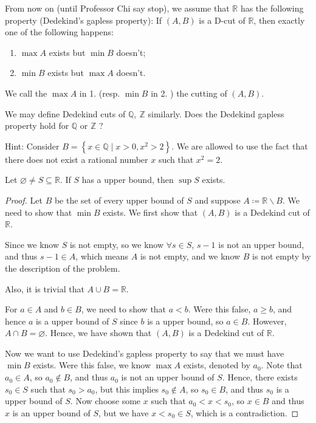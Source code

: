 \begin{theorem}\label{thm: Dedekind's gapless}
	From now on (until Professor Chi say stop), we assume that \(\mathbb{R} \) has the following property (Dedekind's gapless property): If \((A,B)\) is a D-cut of \(\mathbb{R} \), then exactly one of the following happens: 
	\begin{enumerate}
		\item \(\max A\) exists but \(\min B\) doesn't;
		\item \(\min B\) exists but \(\max A\) doesn't.    
	\end{enumerate}  
	We call the \(\max A\) in 1. (resp. \(\min B\) in 2. ) the cutting of \((A,B)\).  
\end{theorem}

\begin{exercise}
	We may define Dedekind cuts of \(\mathbb{Q}, \ \mathbb{Z}  \) similarly. Does the Dedekind gapless property hold for \(\mathbb{Q} \) or \(\mathbb{Z} \) ? 
\end{exercise}
Hint: Consider \(B = \left\{ x \in \mathbb{Q} \mid x > 0, x^2 > 2 \right\} \). We are allowed to use the fact that there does not exist a rational number \(x\) such that \(x^2=2\).   

\begin{theorem}[Weierstrass]\label{thm: Weierstrass}
	Let \(\varnothing \neq S \subseteq \mathbb{R} \). If \(S\) has a upper bound, then \(\sup S\) exists.   
\end{theorem}
\begin{proof}
	Let \(B\) be the set of every upper bound of \(S\) and suppose \(A\coloneqq \mathbb{R} \backslash B\). We need to show that \(\min B\) exists. We first show that \((A,B)\) is a Dedekind cut of \(\mathbb{R} \).
	
	Since we know \(S\) is not empty, so we know \(\forall s \in S\), \(s-1\) is not an upper bound, and thus \(s-1 \in A\), which means \(A\) is not empty, and we know \(B\) is not empty by the description of the problem. 
	
	Also, it is trivial that \(A \cup B = \mathbb{R} \). 
	
	For \(a \in A\) and \(b \in B\), we need to show that \(a < b\). Were this false, \(a \ge b\), and hence \(a\) is a upper bound of \(S\) since \(b\) is a upper bound, so \(a \in B\). However, \(A \cap B = \varnothing \). Hence, we have shown that \((A,B)\) is a Dedekind cut of \(\mathbb{R} \). 
	
	Now we want to use Dedekind's gapless property to say that we must have \(\min B\) exists. Were this false, we know \(\max A\) exists, denoted by \(a_0\). Note that \(a_0 \in A\), so \(a_0 \notin B\), and thus \(a_0\) is not an upper bound of \(S\). Hence, there exists \(s_0 \in S\) such that \(s_0 > a_0\), but this implies \(s_0 \notin A\), so \(s_0 \in B\), and thus \(s_0\) is a upper bound of \(S\). Now choose some \(x\) such that \(a_0 < x < s_0\), so \(x \in B\) and thus \(x\) is an upper bound of \(S\), but we have \(x < s_0 \in S\), which is a contradiction.         
\end{proof}

